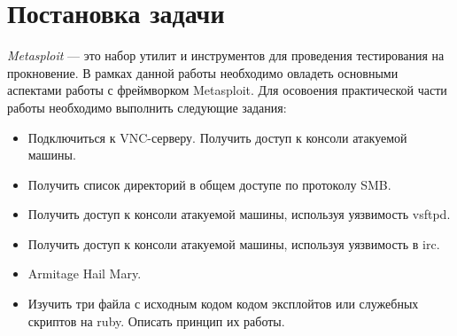 \section{Постановка задачи}

\emph{Metasploit} --- это набор утилит и инструментов для проведения тестирования на прокновение. В рамках данной работы необходимо
овладеть основными аспектами работы с фреймворком Metasploit. Для осовоения практической части работы необходимо выполнить следующие
задания:
\begin{itemize}
    \item Подключиться к VNC-серверу. Получить доступ к консоли атакуемой машины.
    \item Получить список директорий в общем доступе по протоколу SMB.
    \item Получить доступ к консоли атакуемой машины, используя уязвимость vsftpd.
    \item Получить доступ к консоли атакуемой машины, используя уязвимость в irc.
    \item Armitage Hail Mary.
    \item Изучить три файла с исходным кодом кодом эксплойтов или служебных скриптов на ruby. Описать принцип их работы.
\end{itemize}
